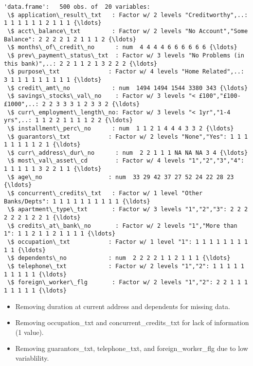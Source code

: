 \documentclass[11pt]{article}
\providecommand{\tightlist}{%
      \setlength{\itemsep}{0pt}\setlength{\parskip}{0pt}}
\begin{document}
    \begin{Verbatim}[commandchars=\\\{\}]
'data.frame':	500 obs. of  20 variables:
 \$ application\_result\_txt   : Factor w/ 2 levels "Creditworthy",..: 1 1 1 1 1 1 2 1 1 1 {\ldots}
 \$ acct\_balance\_txt         : Factor w/ 2 levels "No Account","Some Balance": 2 2 2 2 1 2 1 1 1 2 {\ldots}
 \$ months\_of\_credit\_no      : num  4 4 4 4 6 6 6 6 6 6 {\ldots}
 \$ prev\_payment\_status\_txt  : Factor w/ 3 levels "No Problems (in this bank)",..: 2 2 1 1 2 1 3 2 2 2 {\ldots}
 \$ purpose\_txt              : Factor w/ 4 levels "Home Related",..: 3 1 1 1 1 1 1 1 1 1 {\ldots}
 \$ credit\_amt\_no            : num  1494 1494 1544 3380 343 {\ldots}
 \$ savings\_stocks\_val\_no    : Factor w/ 3 levels "< £100","£100-£1000",..: 2 2 3 3 3 1 2 3 3 2 {\ldots}
 \$ curr\_employment\_length\_no: Factor w/ 3 levels "< 1yr","1-4 yrs",..: 1 1 2 2 1 1 1 1 2 2 {\ldots}
 \$ installment\_perc\_no      : num  1 1 2 1 4 4 4 3 3 2 {\ldots}
 \$ guarantors\_txt           : Factor w/ 2 levels "None","Yes": 1 1 1 1 1 1 1 1 2 1 {\ldots}
 \$ curr\_address\_dur\_no      : num  2 2 1 1 1 NA NA NA 3 4 {\ldots}
 \$ most\_val\_asset\_cd        : Factor w/ 4 levels "1","2","3","4": 1 1 1 1 1 3 2 2 1 1 {\ldots}
 \$ age\_no                   : num  33 29 42 37 27 52 24 22 28 23 {\ldots}
 \$ concurrent\_credits\_txt   : Factor w/ 1 level "Other Banks/Depts": 1 1 1 1 1 1 1 1 1 1 {\ldots}
 \$ apartment\_type\_txt       : Factor w/ 3 levels "1","2","3": 2 2 2 2 2 2 1 2 2 1 {\ldots}
 \$ credits\_at\_bank\_no       : Factor w/ 2 levels "1","More than 1": 1 1 2 1 1 2 1 1 1 1 {\ldots}
 \$ occupation\_txt           : Factor w/ 1 level "1": 1 1 1 1 1 1 1 1 1 1 {\ldots}
 \$ dependents\_no            : num  2 2 2 2 1 1 2 1 1 1 {\ldots}
 \$ telephone\_txt            : Factor w/ 2 levels "1","2": 1 1 1 1 1 1 1 1 1 1 {\ldots}
 \$ foreign\_worker\_flg       : Factor w/ 2 levels "1","2": 2 2 1 1 1 1 1 1 1 1 {\ldots}

    \end{Verbatim}

    \begin{itemize}
\tightlist
\item
  Removing duration at current address and dependents for missing data.
\item
  Removing occupation\_txt and concurrent\_credits\_txt for lack of
  information (1 value).
\item
  Removing guarantors\_txt, telephone\_txt, and foreign\_worker\_flg due
  to low variablility.
\end{itemize}
\end{document}
